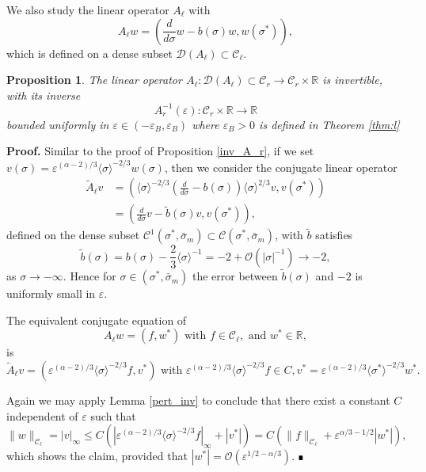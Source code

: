 \documentclass[letterpaper,11pt]{article}
\newcommand{\rmO}{\mathcal{O}}
\newcommand{\eps}{\varepsilon}
\numberwithin{equation}{section}
\theoremstyle{plain}
\newtheorem{proposition}[theorem]{Proposition}
\newenvironment{Proof}[1][.]%
 {\begin{trivlist}\item[]\textbf{Proof#1 }}%
 {\hspace*{\fill}$\rule{0.3\baselineskip}{0.35\baselineskip}$\end{trivlist}}
\begin{document}

We also study the linear operator $A_\ell$ with
\[
A_\ell w = \left(\frac{d}{d\sigma}w - b(\sigma)w, w(\sigma^*)\right),
\] 
which is defined on a dense subset $\mathcal{D}(A_\ell) \subset \mathcal{C}_\ell$.

\begin{proposition} \label{inv_A_l}
The linear operator $A_\ell : \mathcal{D}(A_\ell)\subset \mathcal{C}_r \to \mathcal{C}_r\times \mathbb{R}$ is invertible, with its inverse 
\[
A_r^{-1}(\eps) : \mathcal{C}_r \times \mathbb{R} \to \mathbb{R}
\]
bounded uniformly in $\eps \in (-\eps_B,\eps_B)$ where $\eps_B >0$ is defined in Theorem \ref{thm:l}
\end{proposition}

\begin{Proof}
Similar to the proof of Proposition \ref{inv_A_r}, if we set $v(\sigma) =\eps^{(\alpha-2)/3} \langle\sigma \rangle^{-2/3}w(\sigma)$, then we consider the conjugate linear operator
\begin{align*}
\tilde{A}_\ell v &= \left( \langle \sigma\rangle^{-2/3}\left(\frac{d}{d\sigma}-b(\sigma)\right)\langle \sigma\rangle^{2/3} v, v(\sigma^*) \right) \\
&= \left( \frac{d}{d\sigma}v -\tilde{b}(\sigma)v, v(\sigma^*) \right),
\end{align*}
defined on the dense subset $\mathcal{C}^1(\sigma^*, \bar{\sigma}_m) \subset \mathcal{C}(\sigma^*, \bar{\sigma}_m)$,
with $\tilde{b}$ satisfies 
\[
\tilde{b}(\sigma) = b(\sigma)-\frac{2}{3}\langle \sigma\rangle^{-1} =-2 + \rmO(|\sigma|^{-1}) \to -2, 
\]
as $\sigma \to -\infty$. Hence for $\sigma \in (\sigma^*, \bar{\sigma}_m)$ the error between $\tilde{b}(\sigma)$ and $-2$ is uniformly small in $\eps$.

The equivalent conjugate equation of 
\[
A_\ell w = (f,w^*) \text{ with } f \in \mathcal{C}_\ell, \text{ and }w^* \in \mathbb{R} , 
\] is 
\[
\tilde{A}_\ell v = (\eps^{(\alpha-2)/3}\langle \sigma \rangle^{-2/3} f,v^*) \text{ with } \eps^{(\alpha-2)/3}\langle \sigma \rangle^{-2/3} f \in C, v^* = \eps^{(\alpha-2)/3}\langle \sigma^* \rangle^{-2/3} w^*.
\]

Again we may apply Lemma \ref{pert_inv} to conclude that there exist a constant $C$ independent of $\eps$ such that
\begin{equation}\label{linear_est:l}
\|w\|_{\mathcal{C}_\ell} = |v|_\infty \le C(|\eps^{(\alpha-2)/3}\langle \sigma \rangle^{-2/3} f |_{\infty}+| v^*|) = C(\|f\|_{\mathcal{C}_\ell}+\eps^{\alpha/3-1/2}|w^*|),
\end{equation}
which shows the claim, provided that $|w^*| = \rmO(\eps^{1/2-\alpha/3})$.
\end{Proof}
\end{document}
